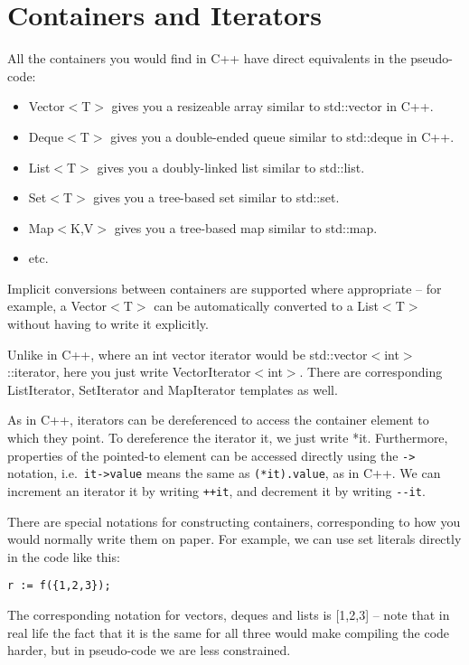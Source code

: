 \section{Containers and Iterators}

All the containers you would find in C++ have direct equivalents in the pseudo-code:
%
\begin{itemize}
\item Vector$<$T$>$ gives you a resizeable array similar to std::vector in C++.
\item Deque$<$T$>$ gives you a double-ended queue similar to std::deque in C++.
\item List$<$T$>$ gives you a doubly-linked list similar to std::list.
\item Set$<$T$>$ gives you a tree-based set similar to std::set.
\item Map$<$K,V$>$ gives you a tree-based map similar to std::map.
\item etc.
\end{itemize}
%
Implicit conversions between containers are supported where appropriate -- for example, a Vector$<$T$>$ can be automatically converted to a List$<$T$>$ without having to write it explicitly.

Unlike in C++, where an int vector iterator would be std::vector$<$int$>$::iterator, here you just write VectorIterator$<$int$>$. There are corresponding ListIterator, SetIterator and MapIterator templates as well.

As in C++, iterators can be dereferenced to access the container element to which they point. To dereference the iterator it, we just write *it. Furthermore, properties of the pointed-to element can be accessed directly using the \lstinline[language=Pseudocode]$->$ notation, i.e.~\lstinline[language=Pseudocode]$it->value$ means the same as \lstinline[language=Pseudocode]$(*it).value$, as in C++. We can increment an iterator it by writing \lstinline[language=Pseudocode]$++it$, and decrement it by writing \lstinline[language=Pseudocode]$--it$.

There are special notations for constructing containers, corresponding to how you would normally write them on paper. For example, we can use set literals directly in the code like this:
%
\begin{lstlisting}[style=Snippet]
r := f({1,2,3});
\end{lstlisting}
%
The corresponding notation for vectors, deques and lists is [1,2,3] -- note that in real life the fact that it is the same for all three would make compiling the code harder, but in pseudo-code we are less constrained.

